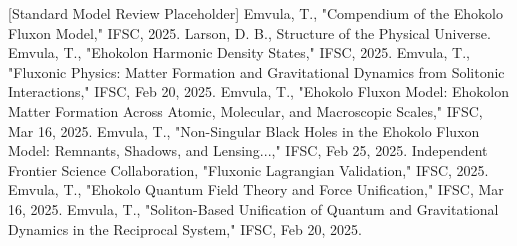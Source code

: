 \documentclass[11pt]{article}
\begin{document}

\begin{thebibliography}{99}
     [Standard Model Review Placeholder]
     Emvula, T., "Compendium of the Ehokolo Fluxon Model," IFSC, 2025.
     Larson, D. B., Structure of the Physical Universe.
     Emvula, T., "Ehokolon Harmonic Density States," IFSC, 2025.
     Emvula, T., "Fluxonic Physics: Matter Formation and Gravitational Dynamics from Solitonic Interactions," IFSC, Feb 20, 2025.
     Emvula, T., "Ehokolo Fluxon Model: Ehokolon Matter Formation Across Atomic, Molecular, and Macroscopic Scales," IFSC, Mar 16, 2025.
     Emvula, T., "Non-Singular Black Holes in the Ehokolo Fluxon Model: Remnants, Shadows, and Lensing...," IFSC, Feb 25, 2025.
     Independent Frontier Science Collaboration, "Fluxonic Lagrangian Validation," IFSC, 2025.
     Emvula, T., "Ehokolo Quantum Field Theory and Force Unification," IFSC, Mar 16, 2025.
     Emvula, T., "Soliton-Based Unification of Quantum and Gravitational Dynamics in the Reciprocal System," IFSC, Feb 20, 2025. %

\end{thebibliography}
\end{document}
